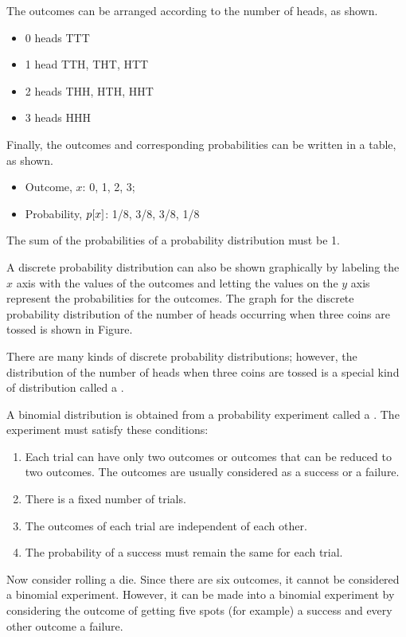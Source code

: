 The outcomes can be arranged according to the number of heads, as shown.
\begin{itemize}
\item 0 heads TTT
\item 1 head TTH, THT, HTT
\item 2 heads THH, HTH, HHT
\item 3 heads HHH
\end{itemize}

Finally, the outcomes and corresponding probabilities can be written in a table, as shown.
\begin{itemize}
\item Outcome, $x$: 0, 1, 2, 3;
\item Probability, $p\!\left[{x}\right]$: 1/8, 3/8, 3/8, 1/8
\end{itemize}
The sum of the probabilities of a probability distribution must be 1.

A discrete probability distribution can also be shown graphically by labeling the $x$ axis with the values of the outcomes and letting the values on the $y$ axis represent the probabilities for the outcomes. The graph for the discrete probability distribution of the number of heads occurring when three coins are tossed is shown in Figure.

There are many kinds of discrete probability distributions; however, the distribution of the number of heads when three coins are tossed is a special kind of distribution called a .

A binomial distribution is obtained from a probability experiment called a . The experiment must satisfy these conditions:
\begin{enumerate}
\item Each trial can have only two outcomes or outcomes that can be reduced to two outcomes. The outcomes are usually considered as a success or a failure.
\item There is a fixed number of trials.
\item The outcomes of each trial are independent of each other.
\item The probability of a success must remain the same for each trial.
\end{enumerate}

Now consider rolling a die. Since there are six outcomes, it cannot be considered a binomial experiment. However, it can be made into a binomial experiment by considering the outcome of getting five spots (for example) a success and every other outcome a failure.

